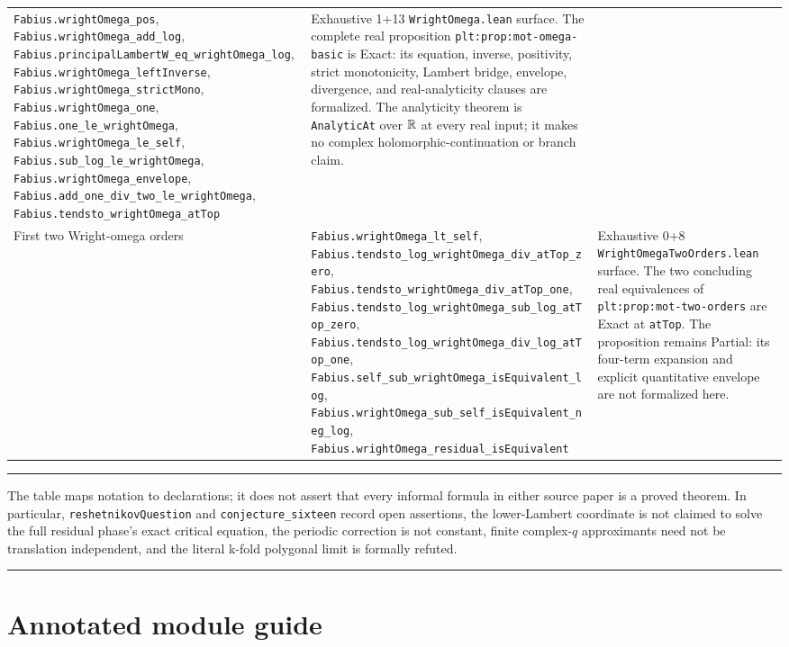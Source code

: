 \documentclass[11pt,oneside]{article}
\theoremstyle{definition}
\theoremstyle{remark}
\newenvironment{boxedremark}{%
  \par\smallskip\noindent\begin{center}\begin{minipage}{0.94\textwidth}%
  \color{black}\hrule\vspace{0.6em}\small
}{%
  \vspace{0.6em}\hrule\end{minipage}\end{center}\smallskip
}
\begin{document}
\begin{longtable}{@{}>{\raggedright\arraybackslash}p{} >{\raggedright\arraybackslash}p{} >{\raggedright\arraybackslash}p{}@{}}
\nolinkurl{Fabius.wrightOmega_pos},
\nolinkurl{Fabius.wrightOmega_add_log},
\nolinkurl{Fabius.principalLambertW_eq_wrightOmega_log},
\nolinkurl{Fabius.wrightOmega_leftInverse},
\nolinkurl{Fabius.wrightOmega_strictMono},
\nolinkurl{Fabius.wrightOmega_one},
\nolinkurl{Fabius.one_le_wrightOmega},
\nolinkurl{Fabius.wrightOmega_le_self},
\nolinkurl{Fabius.sub_log_le_wrightOmega},
\nolinkurl{Fabius.wrightOmega_envelope},
\nolinkurl{Fabius.add_one_div_two_le_wrightOmega},
\nolinkurl{Fabius.tendsto_wrightOmega_atTop} & Exhaustive 1+13
\nolinkurl{WrightOmega.lean} surface.  The complete real proposition
\nolinkurl{plt:prop:mot-omega-basic} is Exact: its equation, inverse,
positivity, strict monotonicity, Lambert bridge, envelope, divergence, and
real-analyticity clauses are formalized.  The analyticity theorem is
\nolinkurl{AnalyticAt} over \(\mathbb{R}\) at every real input; it makes no
complex holomorphic-continuation or branch claim. \\
First two Wright-omega orders &
\nolinkurl{Fabius.wrightOmega_lt_self},
\nolinkurl{Fabius.tendsto_log_wrightOmega_div_atTop_zero},
\nolinkurl{Fabius.tendsto_wrightOmega_div_atTop_one},
\nolinkurl{Fabius.tendsto_log_wrightOmega_sub_log_atTop_zero},
\nolinkurl{Fabius.tendsto_log_wrightOmega_div_log_atTop_one},
\nolinkurl{Fabius.self_sub_wrightOmega_isEquivalent_log},
\nolinkurl{Fabius.wrightOmega_sub_self_isEquivalent_neg_log},
\nolinkurl{Fabius.wrightOmega_residual_isEquivalent} & Exhaustive 0+8
\nolinkurl{WrightOmegaTwoOrders.lean} surface.  The two concluding real
equivalences of \nolinkurl{plt:prop:mot-two-orders} are Exact at
\nolinkurl{atTop}.  The proposition remains Partial: its four-term expansion
and explicit quantitative envelope are not formalized here. \\
\bottomrule
\end{longtable}
\normalsize

\begin{boxedremark}
The table maps notation to declarations; it does not assert that every
informal formula in either source paper is a proved theorem.  In particular,
\nolinkurl{reshetnikovQuestion} and \nolinkurl{conjecture_sixteen} record open
assertions, the lower-Lambert coordinate is not claimed to solve the full
residual phase's exact critical equation, the periodic correction is not
constant, finite complex-\(q\) approximants need not be translation
independent, and the literal k-fold polygonal limit is formally refuted.
\end{boxedremark}

\section{Annotated module guide}\label{app:modules}
\end{document}
